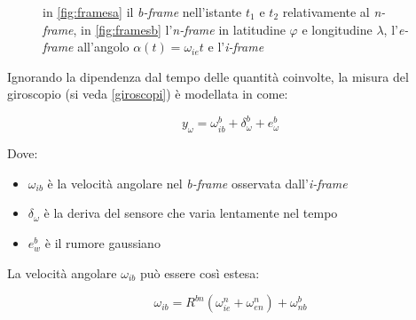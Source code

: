 \begin{figure}[H]
	\centering    
	\caption{in \ref{fig:framesa} il \textit{b-frame} nell'istante $t_1$ e $t_2$ relativamente al \textit{n-frame}, in \ref{fig:framesb} l'\textit{n-frame} in latitudine $\varphi$ e longitudine $\lambda$, l'\textit{e-frame} all'angolo $\alpha(t)= \omega_{ie}t$ e l'\textit{i-frame}}
\end{figure}
Ignorando la dipendenza dal tempo delle quantità coinvolte, la misura del giroscopio (si veda \ref{giroscopi}) è modellata in \cite{gyromodel} come:

\begin{equation}
y_\omega = \omega_{ib}^b + \delta_{\omega}^b + e_\omega^b
\end{equation}

Dove:
\begin{itemize}
	\item $\omega_{ib}$ è la velocità angolare nel \textit{b-frame} osservata dall'\textit{i-frame}
	\item $\delta_\omega$ è la deriva del sensore che varia lentamente nel tempo 
	\item $e_w^b$ è il rumore gaussiano
\end{itemize}

La velocità angolare $\omega_{ib}$ può essere così estesa:

\begin{equation}
\omega_{ib} = R^{bn} ( \omega_{ie}^n + \omega_{en}^n) + \omega_{nb}^b
\end{equation}

